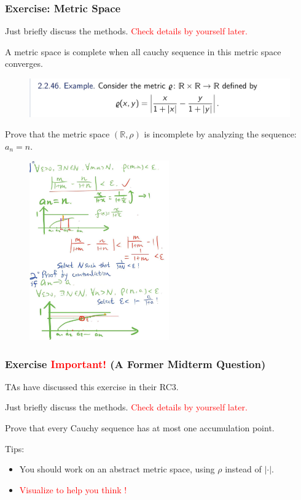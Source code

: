 \documentclass{beamer}
\begin{document}
\begin{frame}
    \frametitle{Exercise: Metric Space}
    Just briefly discuss the methods. \textcolor{red}{Check details by yourself later.}

    A metric space is complete when all cauchy sequence in this metric space converges.
    \begin{figure}[htbp]
        \centering
        \includegraphics[width=12cm]{complete.png}
    \end{figure}
    Prove that the metric space $(\mathbb{R},\rho)$ is incomplete by analyzing the sequence: $a_{n}=n$.
\end{frame}

\begin{frame}
    \begin{figure}[htbp]
        \centering
        \includegraphics[width=6cm]{answerMetric.png}
    \end{figure}
\end{frame}

\begin{frame}
    \frametitle{Exercise \textcolor{red}{Important!} (A Former Midterm Question)}
    TAs have discussed this exercise in their RC3.

    Just briefly discuss the methods. \textcolor{red}{Check details by yourself later.}

    \vspace{2em}
    Prove that every Cauchy sequence has at most one accumulation point.

    \vspace{2em}
    Tips:
    \begin{itemize}
        \item You should work on an abstract metric space, using $\rho $ instead of $| \cdot |$.
        \item \textcolor{red}{Visualize to help you think !}
    \end{itemize}
\end{frame}
\end{document}
